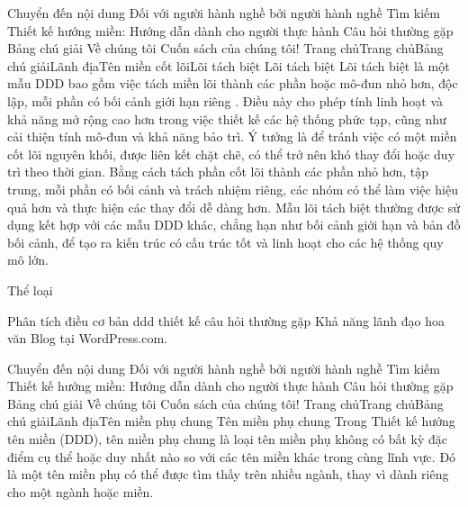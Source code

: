 
Chuyển đến nội dung
Đối với người hành nghề bởi người hành nghề
Tìm kiếm
Thiết kế hướng miền: Hướng dẫn dành cho người thực hành
Câu hỏi thường gặp
Bảng chú giải
Về chúng tôi
Cuốn sách của chúng tôi!
Trang chủTrang chủBảng chú giảiLãnh địaTên miền cốt lõiLõi tách biệt
Lõi tách biệt
Lõi tách biệt là một mẫu DDD bao gồm việc tách miền lõi thành các phần hoặc mô-đun nhỏ hơn, độc lập, mỗi phần có bối cảnh giới hạn riêng . Điều này cho phép tính linh hoạt và khả năng mở rộng cao hơn trong việc thiết kế các hệ thống phức tạp, cũng như cải thiện tính mô-đun và khả năng bảo trì. Ý tưởng là để tránh việc có một miền cốt lõi nguyên khối, được liên kết chặt chẽ, có thể trở nên khó thay đổi hoặc duy trì theo thời gian. Bằng cách tách phần cốt lõi thành các phần nhỏ hơn, tập trung, mỗi phần có bối cảnh và trách nhiệm riêng, các nhóm có thể làm việc hiệu quả hơn và thực hiện các thay đổi dễ dàng hơn. Mẫu lõi tách biệt thường được sử dụng kết hợp với các mẫu DDD khác, chẳng hạn như bối cảnh giới hạn và bản đồ bối cảnh, để tạo ra kiến ​​trúc có cấu trúc tốt và linh hoạt cho các hệ thống quy mô lớn.


Thể loại

Phân tích
điều cơ bản
ddd
thiết kế
câu hỏi thường gặp
Khả năng lãnh đạo
hoa văn
Blog tại WordPress.com.








Chuyển đến nội dung
Đối với người hành nghề bởi người hành nghề
Tìm kiếm
Thiết kế hướng miền: Hướng dẫn dành cho người thực hành
Câu hỏi thường gặp
Bảng chú giải
Về chúng tôi
Cuốn sách của chúng tôi!
Trang chủTrang chủBảng chú giảiLãnh địaTên miền phụ chung
Tên miền phụ chung
Trong Thiết kế hướng tên miền (DDD), tên miền phụ chung là loại tên miền phụ không có bất kỳ đặc điểm cụ thể hoặc duy nhất nào so với các tên miền khác trong cùng lĩnh vực. Đó là một tên miền phụ có thể được tìm thấy trên nhiều ngành, thay vì dành riêng cho một ngành hoặc miền.

